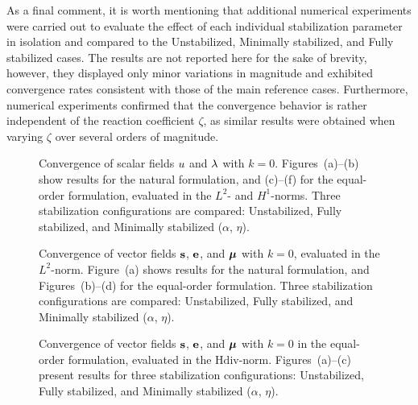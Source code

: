 As a final comment, it is worth mentioning that additional numerical experiments were carried out to evaluate the effect of each individual stabilization parameter in isolation and compared to the Unstabilized, Minimally stabilized, and Fully stabilized cases. The results are not reported here for the sake of brevity, however, they displayed only minor variations in magnitude and exhibited convergence rates consistent with those of the main reference cases. Furthermore, numerical experiments confirmed that the convergence behavior is rather independent of the reaction coefficient $ \zeta $, as similar results were obtained when varying $\zeta$ over several orders of magnitude.


\begin{figure}[h!]
	\centering
	\caption{Convergence of scalar fields $u$ and $\lambda$ with $k=0$. Figures~(a)--(b) show results for the natural formulation, and (c)--(f) for the equal-order formulation, evaluated in the $L^{2}$- and $H^{1}$-norms. Three stabilization configurations are compared: Unstabilized, Fully stabilized, and Minimally stabilized ($\alpha$, $\eta$).
	}
	\def\svgwidth{1.0\columnwidth}
	
	\label{fig:convergence_scalar_linear}
\end{figure}


\begin{figure}[h!]
	\centering
	\caption{Convergence of vector fields $\mathbf{s}$, $\mathbf{e}$, and $\boldsymbol{\mu}$ with $k=0$, evaluated in the $L^{2}$-norm. Figure~(a) shows results for the natural formulation, and Figures~(b)--(d) for the equal-order formulation. Three stabilization configurations are compared: Unstabilized, Fully stabilized, and Minimally stabilized ($\alpha$, $\eta$).
	}
	\def\svgwidth{1.0\columnwidth}
	
	\label{fig:convergence_vector_linear}
\end{figure}


\begin{figure}[h!]
	\centering
	\caption{Convergence of vector fields $\mathbf{s}$, $\mathbf{e}$, and $\boldsymbol{\mu}$ with $k=0$ in the equal-order formulation, evaluated in the $\text{Hdiv}$-norm. Figures~(a)--(c) present results for three stabilization configurations: Unstabilized, Fully stabilized, and Minimally stabilized ($\alpha$, $\eta$).
	}
	\def\svgwidth{1.0\columnwidth}
	
	\label{fig:convergence_vector_linear_hdiv}
\end{figure}



